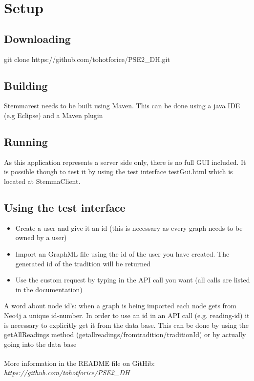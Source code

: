\documentclass[11pt,fleqn,openany]{book} %
\begin{document}
\chapter{Setup}

\section*{Downloading}

git clone https://github.com/tohotforice/PSE2\_DH.git

\section*{Building}

Stemmarest needs to be built using Maven. This can be done using a java IDE (e.g Eclipse) and a Maven plugin

\section*{Running}

As this application represents a server side only, there is no full GUI included. It is possible though to test it by using the test interface testGui.html which is located at StemmaClient.

\section*{Using the test interface}

\begin{itemize}
\item Create a user and give it an id (this is necessary as every graph needs to be owned by a user)
\item Import an GraphML file using the id of the user you have created. The generated id of the tradition will be returned
\item Use the custom request by typing in the API call you want (all calls are listed in the documentation)
\end{itemize}
A word about node id's: when a graph is being imported each node gets from Neo4j a unique id-number. In order to use an id in an API call (e.g. reading-id) it is necessary to explicitly get it from the data base. This can be done by using the getAllReadings method (getallreadings/fromtradition/{traditionId}) or by actually going into the data base \\ \quad \\ More information in the README file on GitHib: \textit{https://github.com/tohotforice/PSE2_DH}
\end{document}
